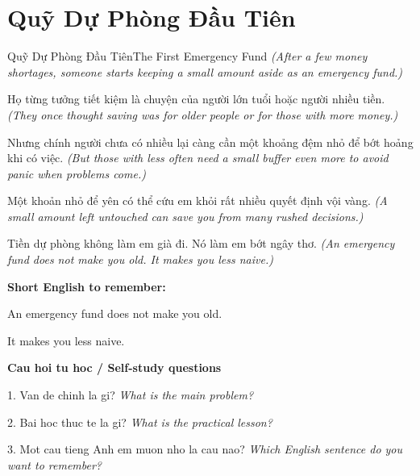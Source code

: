 \section{Quỹ Dự Phòng Đầu Tiên}
\begin{truyen}{Quỹ Dự Phòng Đầu Tiên}{The First Emergency Fund}
\textit{(After a few money shortages, someone starts keeping a small amount aside as an emergency fund.)}

Họ từng tưởng tiết kiệm là chuyện của người lớn tuổi hoặc người nhiều tiền.
\textit{(They once thought saving was for older people or for those with more money.)}

Nhưng chính người chưa có nhiều lại càng cần một khoảng đệm nhỏ để bớt hoảng khi có việc.
\textit{(But those with less often need a small buffer even more to avoid panic when problems come.)}

Một khoản nhỏ để yên có thể cứu em khỏi rất nhiều quyết định vội vàng.
\textit{(A small amount left untouched can save you from many rushed decisions.)}

\end{truyen}

\begin{baihoc}
Tiền dự phòng không làm em già đi. Nó làm em bớt ngây thơ.
\textit{(An emergency fund does not make you old. It makes you less naive.)}
\end{baihoc}

\begin{ghinhoanh}
\textbf{Short English to remember:}

An emergency fund does not make you old.

It makes you less naive.

\end{ghinhoanh}

\begin{tuhocnhanh}
\textbf{Cau hoi tu hoc / Self-study questions}

1. Van de chinh la gi? \textit{What is the main problem?}

2. Bai hoc thuc te la gi? \textit{What is the practical lesson?}

3. Mot cau tieng Anh em muon nho la cau nao? \textit{Which English sentence do you want to remember?}
\end{tuhocnhanh}
\ngancach

